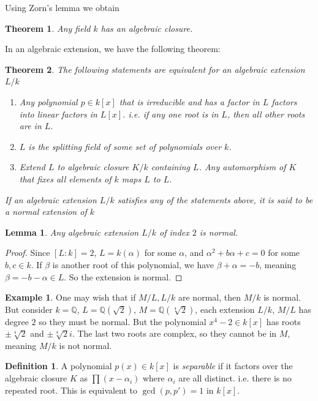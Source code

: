 \documentclass[12pt]{article}
\newtheorem{theorem}{Theorem}[subsection]
\newtheorem{lemma}{Lemma}[subsection]
\theoremstyle{remark}
\theoremstyle{definition}
\newtheorem{example}{Example}[subsection]
\newtheorem{definition}{Definition}[subsection]
\newcommand{\Q}[0]{\mathbb{Q}}
\begin{document}
        Using Zorn's lemma we obtain
        \begin{theorem}
            Any field $k$ has an algebraic closure.  
        \end{theorem}
        In an algebraic extension, we have the following theorem:
        \begin{theorem}
            The following statements are equivalent for an algebraic extension $L/k$
            \begin{enumerate}[\normalfont(i)]
                \item Any polynomial $p \in k[x]$ that is irreducible and has a factor in $L$ factors into linear factors in $L[x]$. i.e. if any one root is in $L$, then all other roots are in $L$.
                \item $L$ is the splitting field of some set of polynomials over $k$. 
                \item Extend $L$ to algebraic closure $K/k$ containing $L$. Any automorphism of $K$ that fixes all elements of $k$ maps $L$ to $L$.
            \end{enumerate}
            If an algebraic extension $L/k$ satisfies any of the statements above, it is said to be \textup{a normal extension of $k$}
        \end{theorem}
        
        \begin{lemma}
            Any algebraic extension $L/k$ of index $2$ is normal.
        \end{lemma}
        \begin{proof}
            Since $[L:k]=2$, $L = k(\alpha)$ for some $\alpha$, and $\alpha^2 + b \alpha + c = 0$ for some $b, c \in k$. If $\beta$ is another root of this polynomial, we have $\beta + \alpha = -b$, meaning $\beta = -b - \alpha \in L$. So the extension is normal.  
        \end{proof}
        \begin{example}
            One may wish that if $M/L, L/k$ are normal, then $M/k$ is normal. But consider $k = \Q$, $L = \Q(\sqrt{2})$, $M = \Q(\sqrt[4]{2})$, each extension $L/k$, $M/L$ has degree $2$ so they must be normal. But the polynomial $x^4 - 2 \in k[x]$ has roots $\pm \sqrt[4]{2}$ and $\pm \sqrt[4]{2} i$. The last two roots are complex, so they cannot be in       $M$, meaning $M/k$ is not normal. 
        \end{example}
        
        \begin{definition}%
            A polynomial $p(x) \in k[x]$ is \textit{separable} if it factors over the algebraic closure $K$ as $\prod (x-\alpha_i)$ where $\alpha_i$ are all distinct. i.e. there is no repeated root. This is equivalent to $\gcd(p, p') = 1$ in $k[x]$.
        \end{definition}
        
\end{document}
